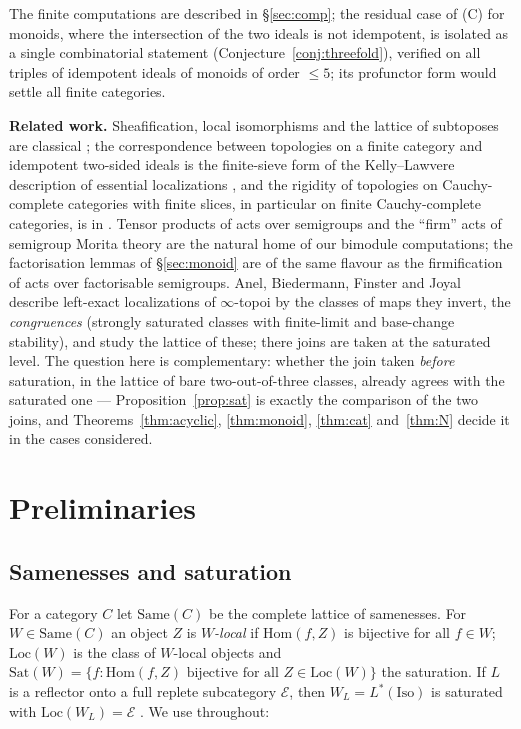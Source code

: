 \documentclass[11pt]{amsart}
\theoremstyle{definition}
\newcommand{\Same}{\mathrm{Same}}
\newcommand{\Iso}{\mathrm{Iso}}
\newcommand{\Sat}{\mathrm{Sat}}
\newcommand{\Loc}{\mathrm{Loc}}
\newcommand{\Hom}{\mathrm{Hom}}
\begin{document}
The finite computations are described in \S\ref{sec:comp}; the residual case
of (C) for monoids, where the intersection of the two ideals is not
idempotent, is isolated as a single combinatorial statement
(Conjecture~\ref{conj:threefold}), verified on all triples of idempotent ideals
of monoids of order $\le5$; its profunctor form would settle all finite
categories.

\medskip\noindent\textbf{Related work.} Sheafification, local isomorphisms and
the lattice of subtoposes are classical \cite{MLM,Elephant}; the
correspondence between topologies on a finite category and idempotent
two-sided ideals is the finite-sieve form of the Kelly--Lawvere description of
essential localizations \cite{KL89}, and the rigidity of topologies on Cauchy-complete categories with finite
slices, in particular on finite Cauchy-complete categories, is in
\cite{Elephant,Marques25}. Tensor
products of acts over semigroups and the ``firm'' acts of semigroup Morita
theory \cite{LMR18} are the natural home of our bimodule computations; the
factorisation lemmas of \S\ref{sec:monoid} are of the same flavour as the
firmification of acts over factorisable semigroups. Anel, Biedermann, Finster and Joyal \cite{ABFJ} describe left-exact
localizations of $\infty$-topoi by the classes of maps they invert, the
\emph{congruences} (strongly saturated classes with finite-limit and
base-change stability), and study the lattice of these; there joins are taken
at the saturated level. The question here is complementary: whether the join
taken \emph{before} saturation, in the lattice of bare two-out-of-three
classes, already agrees with the saturated one --- Proposition~\ref{prop:sat}
is exactly the comparison of the two joins, and Theorems~\ref{thm:acyclic},
\ref{thm:monoid}, \ref{thm:cat} and~\ref{thm:N} decide it in the cases
considered.

\section{Preliminaries}\label{sec:prelim}

\subsection{Samenesses and saturation}
For a category $C$ let $\Same(C)$ be the complete lattice of samenesses. For
$W\in\Same(C)$ an object $Z$ is \emph{$W$-local} if $\Hom(f,Z)$ is bijective
for all $f\in W$; $\Loc(W)$ is the class of $W$-local objects and
$\Sat(W)=\{f:\Hom(f,Z)\text{ bijective for all }Z\in\Loc(W)\}$ the
saturation. If $L$ is a reflector onto a full replete subcategory
$\mathcal E$, then $W_L=L^*(\Iso)$ is saturated with $\Loc(W_L)=\mathcal E$
\cite[Lemma~2.3]{Postnikov}. We use throughout:
\end{document}

